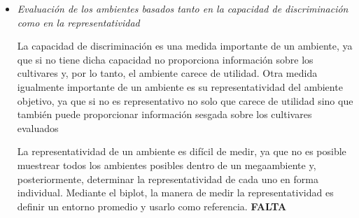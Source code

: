 \begin{itemize}[wide, nosep, labelindent = 0pt,  noitemsep, topsep=0pt]
\item \emph{Evaluación de los ambientes basados tanto en la capacidad de discriminación como en la representatividad}

La capacidad de discriminación es una medida importante de un ambiente, ya que si no tiene dicha capacidad no proporciona información sobre los cultivares y, por lo tanto, el ambiente carece de utilidad. Otra medida igualmente importante de un ambiente es su representatividad del ambiente objetivo, ya que si no es representativo no solo que carece de utilidad sino que también puede proporcionar información sesgada sobre los cultivares evaluados

La representatividad de un ambiente es difícil de medir, ya que no es posible muestrear todos los ambientes posibles dentro de un megaambiente y, posteriormente, determinar la representatividad de cada uno en forma individual. Mediante el biplot, la manera de medir la representatividad es definir un entorno promedio y usarlo como referencia. \textbf{FALTA}



\end{itemize}
